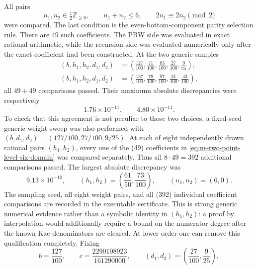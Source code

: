 \documentclass[11pt]{article}
\begin{document}
All pairs
\begin{equation}
 n_1,n_2\in\tfrac12\mathbb Z_{\geq0},
 \qquad n_1+n_2\leq6,
 \qquad 2n_1\equiv2n_2\pmod2
 \label{eq:ns-two-point-level-six-domain}
\end{equation}
were compared.  The last condition is the even-bottom-component parity
selection rule.  There are \(49\) such coefficients.  The PBW side was
evaluated in exact rational arithmetic, while the recursion side was
evaluated numerically only after the exact coefficient had been constructed.
At the two generic samples
\begin{align}
 (b,h_1,h_2,d_1,d_2)
 &=\left(\frac{127}{100},\frac{71}{100},\frac{83}{100},
 \frac{27}{100},\frac9{25}\right),
 \\
 (b,h_1,h_2,d_1,d_2)
 &=\left(\frac{137}{100},\frac{79}{100},\frac{97}{100},
 \frac{31}{100},\frac{43}{100}\right),
\end{align}
all \(49+49\) comparisons passed.  Their maximum absolute discrepancies
were respectively
\begin{equation}
 1.76\times10^{-11},
 \qquad
 4.80\times10^{-11}.
 \label{eq:ns-two-point-level-six-errors}
\end{equation}
To check that this agreement is not peculiar to those two choices, a
fixed-seed generic-weight sweep was also performed with
\((b,d_1,d_2)=(127/100,27/100,9/25)\).  At each of eight independently
drawn rational pairs \((h_1,h_2)\), every one of the (49) coefficients in
\eqref{eq:ns-two-point-level-six-domain} was compared separately.  Thus all
\(8\cdot49=392\) additional comparisons passed.  The largest absolute
discrepancy was
\begin{equation}
 9.13\times10^{-10},
 \qquad
 (h_1,h_2)=\left(\frac{61}{50},\frac{73}{100}\right),
 \qquad
 (n_1,n_2)=(6,0).
 \label{eq:ns-two-point-generic-sweep-error}
\end{equation}
The sampling seed, all eight weight pairs, and all (392) individual
coefficient comparisons are recorded in the executable certificate.  This
is strong generic numerical evidence rather than a symbolic identity in
\((h_1,h_2)\): a proof by interpolation would additionally require a bound
on the numerator degree after the known Kac denominators are cleared.
At lower order one can remove this qualification completely.  Fixing
\begin{equation}
 b=\frac{127}{100},
 \qquad
 c=\frac{2290108923}{161290000},
 \qquad
 (d_1,d_2)=\left(\frac{27}{100},\frac9{25}\right),
 \label{eq:ns-two-point-symbolic-fixed-data}
\end{equation}
\end{document}
